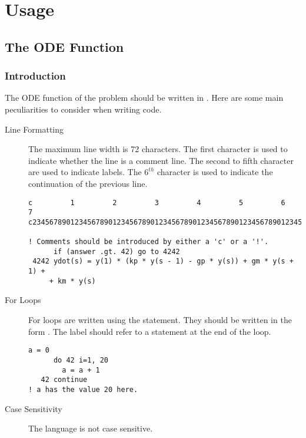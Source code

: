 \chapter[Usage]{Usage}
\section[ODE Function]{The ODE Function}
\subsection{Introduction}
The ODE function of the problem should be written in . Here are some main \Fortran peculiarities to consider when writing \Fortran code.
\begin{description}
 \item[Line Formatting] The maximum line width is 72 characters. The first character is used to indicate whether the line is a comment line. The second to fifth character are used to indicate labels. The $6^{th}$ character is used to indicate the continuation of the previous line.
 \begin{lstlisting}[style=fortrancode,caption=Syntax Example]
c         1         2         3         4         5         6         7
c23456789012345678901234567890123456789012345678901234567890123456789012

! Comments should be introduced by either a 'c' or a '!'.
      if (answer .gt. 42) go to 4242
 4242 ydot(s) = y(1) * (kp * y(s - 1) - gp * y(s)) + gm * y(s + 1) +
     + km * y(s)
 \end{lstlisting}
 \item[For Loops] For loops are written using the  statement. They should be written in the form . The label should refer to a  statement at the end of the loop.
  \begin{lstlisting}[style=fortrancode,caption=Do-Loop]
      a = 0
      do 42 i=1, 20
        a = a + 1
   42 continue
! a has the value 20 here.
 \end{lstlisting}
 \item[Case Sensitivity] The \Fortran language is not case sensitive.
\end{description}

